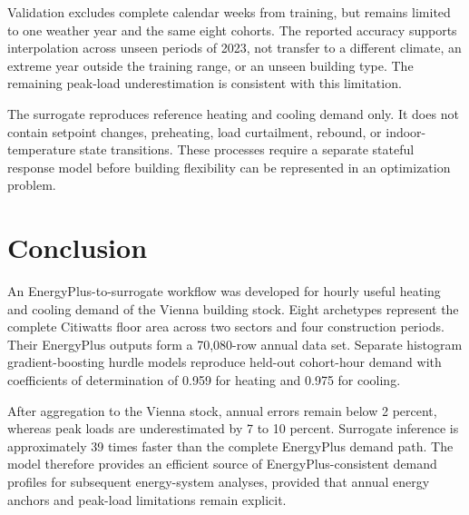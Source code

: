 \documentclass[conference]{IEEEtran}
\begin{document}
Validation excludes complete calendar weeks from training, but remains limited
to one weather year and the same eight cohorts. The reported accuracy supports
interpolation across unseen periods of 2023, not transfer to a different
climate, an extreme year outside the training range, or an unseen building
type. The remaining peak-load underestimation is consistent with this
limitation.

The surrogate reproduces reference heating and cooling demand only. It does
not contain setpoint changes, preheating, load curtailment, rebound, or
indoor-temperature state transitions. These processes require a separate
stateful response model before building flexibility can be represented in an
optimization problem.

\section{Conclusion}

An EnergyPlus-to-surrogate workflow was developed for hourly useful heating
and cooling demand of the Vienna building stock. Eight archetypes represent
the complete Citiwatts floor area across two sectors and four construction
periods. Their EnergyPlus outputs form a 70,080-row annual data set. Separate
histogram gradient-boosting hurdle models reproduce held-out cohort-hour
demand with coefficients of determination of 0.959 for heating and 0.975 for
cooling.

After aggregation to the Vienna stock, annual errors remain below 2 percent,
whereas peak loads are underestimated by 7 to 10 percent. Surrogate inference
is approximately 39 times faster than the complete EnergyPlus demand path.
The model therefore provides an efficient source of EnergyPlus-consistent
demand profiles for subsequent energy-system analyses, provided that annual
energy anchors and peak-load limitations remain explicit.
\end{document}
